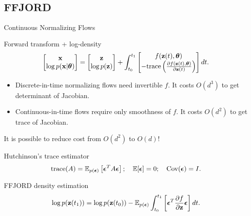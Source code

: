 \documentclass{beamer}
\begin{document}
\subsection{FFJORD}
\begin{frame}{Continuous Normalizing Flows}
	\begin{block}{Forward transform + log-density}
		\vspace{-0.8cm}
		\[
			\begin{bmatrix}
				\mathbf{x} \\
				\log p(\mathbf{x} | \boldsymbol{\theta})
			\end{bmatrix}
			= 
			\begin{bmatrix}
				\mathbf{z} \\
				\log p(\mathbf{z})
			\end{bmatrix} + 
			\int_{t_0}^{t_1} 
			\begin{bmatrix}
				f(\mathbf{z}(t), \boldsymbol{\theta}) \\
				- \text{trace} \left( \frac{\partial f(\mathbf{z}(t), \boldsymbol{\theta})}{\partial \mathbf{z}(t)} \right) 
			\end{bmatrix} dt.
		\]
		\vspace{-0.4cm}
	\end{block}
	\begin{itemize}
		\item Discrete-in-time normalizing flows need invertible $f$. It costs $O(d^3)$ to get determinant of Jacobian.
		\item Continuous-in-time flows require only smoothness of $f$. It costs $O(d^2)$ to get trace of Jacobian.
	\end{itemize}
	It is possible to reduce cost from $O(d^2)$ to $O(d)$!
	\begin{block}{Hutchinson's trace estimator}
		\vspace{-0.3cm}
		\[
		    \text{trace}(A) = \mathbb{E}_{p(\boldsymbol{\epsilon})} \left[ \boldsymbol{\epsilon}^T A \boldsymbol{\epsilon} \right]; \quad \mathbb{E} [\boldsymbol{\epsilon}] = 0; \quad \text{Cov} (\boldsymbol{\epsilon}) = I.
		\]
		\vspace{-0.5cm}
	\end{block}
	\begin{block}{FFJORD density estimation}
		\vspace{-0.4cm}
		\[
		    \log p(\mathbf{z}(t_1)) = \log p(\mathbf{z}(t_0)) - \mathbb{E}_{p(\boldsymbol{\epsilon})} \int_{t_0}^{t_1} \left[ \boldsymbol{\epsilon}^T \frac{\partial f}{\partial \mathbf{z}} \boldsymbol{\epsilon} \right] dt.
		\]
	\end{block}
\end{frame}
\end{document}
